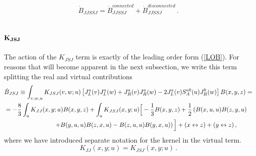 \documentclass[11pt,a4paper]{article}
\def\beq{\begin{equation}}
\def\eeq{\end{equation}}
\def\beq{\begin{equation}}
\def\eeq{\end{equation}}
\begin{document}
\beq
\dot B_{JJSSJ}=\dot B_{JJSSJ}^{connected}+\dot B_{JJSSJ}^{disconnected}\,.
\eeq

\subsection*{$\bf K_{JSJ}$}

The action of the $K_{JSJ}$ term is exactly of the leading order form (\ref{LOB}).
 For reasons that will become apparent in the next subsection, we write this term splitting the real and virtual contributions 
 \begin{equation}\begin{split}\label{BJSJ}
&\dot B_{JSJ}\equiv
\int_{v,w,u}K_{JSJ}(v,w;u)\left[J_{L}^{a}(v)J_{L}^{a}(w)+J_{R}^{a}(v)J_{R}^{a}(w)-2J_{L}^{a}(v)S_A^{ab}(u)J_{R}^{b}(w)\right]B(x,y,z)=\\
&=-{8\over 3} \int_{u}K_{JJ}(x,y;u)B(x,y,z)+  \int_{u}K_{JSJ}(x,y;u)\Big[-{1\over 3} B(x,y,z)+\frac{1}{2}\left(B(x,u,u)B(z,y,u)\right.\\ 
&\left.\ \ \ \ \ \ \ \ \ \ \ \ \ \ \ \ \ \ \ \ \ \ \ \ +B(y,u,u)B(z,x,u)-B(z,u,u)B(y,x,u)\right)\Big]+(x\leftrightarrow z)+(y\leftrightarrow z)\,,\\
 \end{split}\end{equation}
 where we have introduced separate notation for the kernel in the virtual term.
\beq
K_{JJ}(x,y;u)= K_{JSJ}(x,y;u)\,.\eeq
\end{document}

